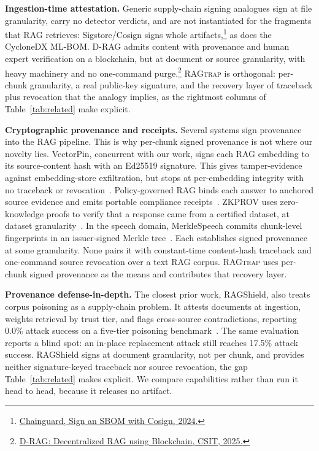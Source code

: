 \documentclass[12pt]{article}
\newcommand{\sysname}{\textsc{RAGtrap}\xspace}
\begin{document}
\textbf{Ingestion-time attestation.} Generic supply-chain signing analogues sign
at file granularity, carry no detector verdicts, and are not instantiated for the
fragments that RAG retrieves: Sigstore/Cosign signs whole
artifacts,\footnote{\href{https://edu.chainguard.dev/open-source/sigstore/cosign/how-to-sign-an-sbom-with-cosign/}{Chainguard,
Sign an SBOM with Cosign, 2024.}} as does the CycloneDX
ML-BOM. D-RAG admits content
with provenance and human expert verification on a blockchain, but at document
or source granularity, with heavy machinery and no one-command
purge.\footnote{\href{https://aircconline.com/csit/papers/vol15/csit150417.pdf}{D-RAG:
Decentralized RAG using Blockchain, CSIT, 2025.}} \sysname{} is orthogonal: per-chunk granularity, a real public-key
signature, and the recovery layer of traceback plus revocation that the analogy
implies, as the rightmost columns of Table~\ref{tab:related} make explicit.

\textbf{Cryptographic provenance and receipts.} Several systems sign provenance
into the RAG pipeline. This is why per-chunk signed provenance is not where our
novelty lies. VectorPin, concurrent with our work, signs each RAG embedding to
its source-content hash with an Ed25519 signature. This gives tamper-evidence
against embedding-store exfiltration, but stops at per-embedding integrity with
no traceback or revocation~\cite{VectorPin}. Policy-governed RAG binds each
answer to anchored source evidence and emits portable compliance
receipts~\cite{leray2025policy}. ZKPROV uses zero-knowledge proofs to verify that
a response came from a certified dataset, at dataset
granularity~\cite{ZKPROV}. In the speech domain, MerkleSpeech commits chunk-level
fingerprints in an issuer-signed Merkle tree~\cite{MerkleSpeech}. Each
establishes signed provenance at some granularity. None pairs it with
constant-time content-hash traceback and one-command source revocation over a
text RAG corpus. \sysname{} uses per-chunk signed provenance as the means and
contributes that recovery layer.

\textbf{Provenance defense-in-depth.} The closest prior work, RAGShield, also
treats corpus poisoning as a supply-chain problem. It attests documents at
ingestion, weights retrieval by trust tier, and flags cross-source
contradictions, reporting 0.0\% attack success on a five-tier poisoning
benchmark~\cite{ragshield}. The same evaluation reports a blind spot: an in-place
replacement attack still reaches 17.5\% attack success. RAGShield signs at
document granularity, not per chunk, and provides neither signature-keyed
traceback nor source revocation, the gap Table~\ref{tab:related} makes explicit.
We compare capabilities rather than run it head to head, because it releases no
artifact.
\end{document}
